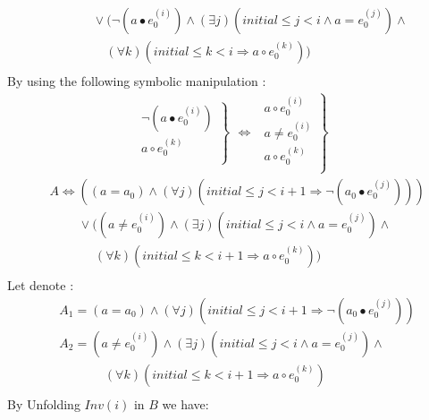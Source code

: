 \documentclass[a4paper,10pt]{article}
\newcommand{\idx}{\ensuremath{i}\xspace}
\newcommand{\idxinitial}{\ensuremath{\mathit{initial}}\xspace}
\newcommand{\at}[1]{{(#1)}}
\newcommand{\impl}{\ensuremath{\Longrightarrow}}
\newcommand{\Inv}[1]{\ensuremath{\mathit{Inv}(#1)\xspace}}
\newenvironment{proof}[1][Proof.]{\begin{trivlist}
\item[\hskip \labelsep {\bfseries #1}]}{\end{trivlist}}
\begin{document}
\begin{proof}
\begin{align*}
    &\phantom{A=} 
       \lor (\neg (a \bullet e_0^\at{\idx}) \land (\exists j)(\idxinitial \leq j < \idx \land a = e_0^\at{j}) \land\\ 
    &\phantom{A= \lor (} 
       (\forall k)(\idxinitial \leq k < \idx \impl a \circ e_0^\at{k})) \\   
  \end{align*}
  By using the following symbolic manipulation :
  $$\begin{array}{cl}
    \left.\begin{aligned}
      \neg (a \bullet e_0^\at{\idx})\\
      a \circ e_0^\at{k}\\
    \end{aligned} \right\}
  \end{array} 
  \Leftrightarrow
  \begin{array}{cl}
    \left.\begin{aligned}
      a \circ e_0^\at{\idx}\\
      a \neq e_0^\at{\idx}\\
      a \circ e_0^\at{k}\\
    \end{aligned} \right\}
   \end{array}$$
  \begin{align*}
    &A\Leftrightarrow ((a = a_0) \land (\forall j)(\idxinitial \leq j < \idx+1 \impl \neg (a_0 \bullet e_0^\at{j}))) \\
    &\phantom{A\Leftrightarrow} 
       \lor ((a \neq e_0^\at{\idx}) \land (\exists j)(\idxinitial \leq j < \idx \land a = e_0^\at{j}) \land \\
    &\phantom{A\Leftrightarrow ((a} 
        (\forall k)(\idxinitial \leq k < \idx+1 \impl a \circ e_0^\at{k})) \\           
  \end{align*}
  Let denote :
  \begin{align*}
    &A_1=(a = a_0) \land (\forall j)(\idxinitial \leq j < \idx+1 \impl \neg (a_0 \bullet e_0^\at{j}))\\
    &A_2=(a \neq e_0^\at{\idx}) \land (\exists j)(\idxinitial \leq j < \idx \land a = e_0^\at{j}) \land \\
    &\phantom{A\Leftrightarrow ((a} 
        (\forall k)(\idxinitial \leq k < \idx+1 \impl a \circ e_0^\at{k}) \\    
  \end{align*}
  By Unfolding $\Inv{\idx}$ in $B$ we have:
  \begin{align*}

\end{align*}
\end{proof}
\end{document}

